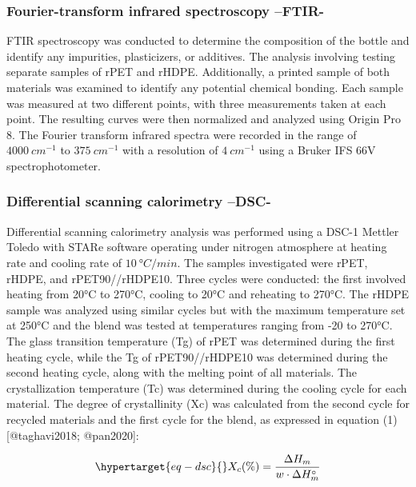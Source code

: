 \documentclass[
  letterpaper,
  DIV=11,
  numbers=noendperiod]{scrartcl}
\begin{document}
\hypertarget{fourier-transform-infrared-spectroscopy-ftir-}{%
\subsubsection{Fourier-transform infrared spectroscopy
--FTIR-}\label{fourier-transform-infrared-spectroscopy-ftir-}}

FTIR spectroscopy was conducted to determine the composition of the
bottle and identify any impurities, plasticizers, or additives. The
analysis involving testing separate samples of rPET and rHDPE.
Additionally, a printed sample of both materials was examined to
identify any potential chemical bonding. Each sample was measured at two
different points, with three measurements taken at each point. The
resulting curves were then normalized and analyzed using Origin Pro 8.
The Fourier transform infrared spectra were recorded in the range of
\(4000~cm^{-1}\) to \(375~cm^{-1}\) with a resolution of \(4~cm^{-1}\)
using a Bruker IFS 66V spectrophotometer.

\hypertarget{differential-scanning-calorimetry-dsc-}{%
\subsubsection{Differential scanning calorimetry
--DSC-}\label{differential-scanning-calorimetry-dsc-}}

Differential scanning calorimetry analysis was performed using a DSC-1
Mettler Toledo with STARe software operating under nitrogen atmosphere
at heating rate and cooling rate of \(10~°C/min\). The samples
investigated were rPET, rHDPE, and rPET90//rHDPE10. Three cycles were
conducted: the first involved heating from 20°C to 270°C, cooling to
20°C and reheating to 270°C. The rHDPE sample was analyzed using similar
cycles but with the maximum temperature set at 250°C and the blend was
tested at temperatures ranging from -20 to 270°C. The glass transition
temperature (Tg) of rPET was determined during the first heating cycle,
while the Tg of rPET90//rHDPE10 was determined during the second heating
cycle, along with the melting point of all materials. The
crystallization temperature (Tc) was determined during the cooling cycle
for each material. The degree of crystallinity (Xc) was calculated from
the second cycle for recycled materials and the first cycle for the
blend, as expressed in equation (1) {[}@taghavi2018; @pan2020{]}:

\begin{equation}\protect\hypertarget{eq-dsc}{}{
X_{c}(\%) = \frac{\Delta H_{m}}{w \cdot \Delta H_{m}^\circ}
}\label{eq-dsc}\end{equation}
\end{document}
